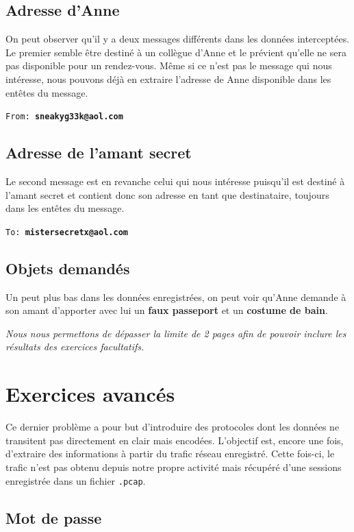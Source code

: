 \documentclass[11pt,a4paper]{article}
\begin{document}
\subsection{Adresse d'Anne}

On peut observer qu'il y a deux messages différents dans les données interceptées. Le premier semble être destiné à un collègue d'Anne et le prévient qu'elle ne sera pas disponible pour un rendez-vous. Même si ce n'est pas le message qui nous intéresse, nous pouvons déjà en extraire l'adresse de Anne disponible dans les entêtes du message.

\texttt{From: \textbf{sneakyg33k@aol.com}}

\subsection{Adresse de l'amant secret}

Le second message est en revanche celui qui nous intéresse puisqu'il est destiné à l'amant secret et contient donc son adresse en tant que destinataire, toujours dans les entêtes du message.

\texttt{To: \textbf{mistersecretx@aol.com}}

\subsection{Objets demandés}

Un peut plus bas dans les données enregistrées, on peut voir qu'Anne demande à son amant d'apporter avec lui un \textbf{faux passeport} et un \textbf{costume de bain}.

\newpage

{\em Nous nous permettons de dépasser la limite de 2 pages afin de pouvoir inclure les résultats des exercices facultatifs.}

\section{Exercices avancés}

Ce dernier problème a pour but d'introduire des protocoles dont les données ne transitent pas directement en clair mais encodées. L'objectif est, encore une fois, d'extraire des informations à partir du trafic réseau enregistré. Cette fois-ci, le trafic n'est pas obtenu depuis notre propre activité mais récupéré d'une sessions enregistrée dans un fichier \texttt{.pcap}.

\subsection{Mot de passe}
\end{document}
